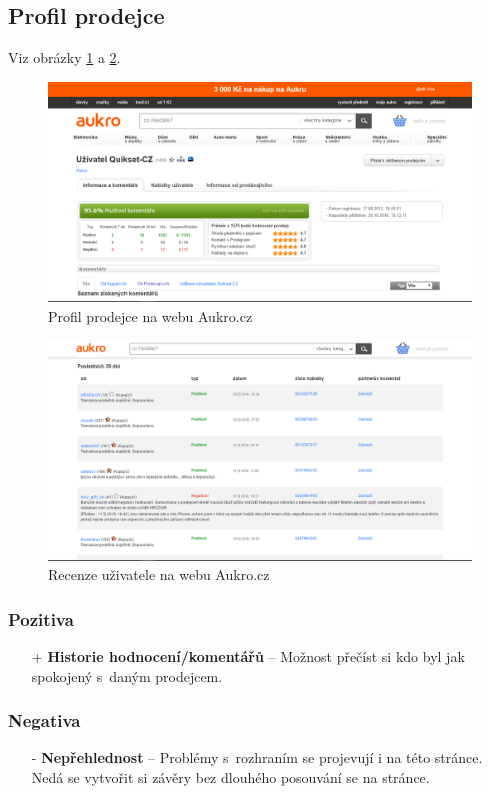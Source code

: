 \subsection{Profil prodejce}
Viz obrázky \ref{fig:aukro:profile} a  \ref{fig:aukro:profile2}.
\begin{figure}[h]
    \centering
    \includegraphics[width=1.0\textwidth]{media/aukro/profile.png}
    \caption{Profil prodejce na webu Aukro.cz}
    \label{fig:aukro:profile}
\end{figure}
\begin{figure}[h]
    \centering
    \includegraphics[width=1.0\textwidth]{media/aukro/profile2.png}
    \caption{Recenze uživatele na webu Aukro.cz}
    \label{fig:aukro:profile2}
\end{figure}
\subsubsection*{Pozitiva}
\begin{itemize}
    \item[+] \textbf{Historie hodnocení/komentářů} -- Možnost přečíst si kdo byl jak spokojený s~daným prodejcem.
\end{itemize}
\subsubsection*{Negativa}
\begin{itemize}
    \item[-] \textbf{Nepřehlednost} -- Problémy s~rozhraním se projevují i na této stránce. Nedá se vytvořit si závěry bez dlouhého posouvání se na stránce.
\end{itemize}



